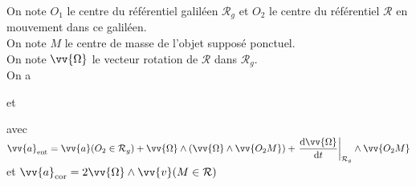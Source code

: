 ﻿\documentclass[a4paper]{article}
\begin{document}
\pagestyle{fancy}
\fancyhf{}
\setlength{\headheight}{15pt}

\begin{center}
	\large{}
\end{center}


On note \(O_1\) le centre du référentiel galiléen \(\mathcal{R}_g\) et \(O_2\) le centre du référentiel \(\mathcal{R}\) en mouvement dans ce galiléen.\\
On note \(M\) le centre de masse de l'objet supposé ponctuel.\\
On note \(\vv{\Omega}\) le vecteur rotation de \(\mathcal{R}\) dans \(\mathcal{R}_g\). \\
On a
\begin{center}
\end{center}
et
\begin{center}
\end{center}
avec \(\vv{a}_{\mathrm{ent}}=\vv{a}(O_2\in\mathcal{R}_g)+\vv{\Omega}\wedge(\vv{\Omega}\wedge\vv{O_2M})+
\left.\dfrac{\mathrm{d}\vv{\Omega}}{\mathrm{d}t}\right|_{\mathcal{R}_g}\wedge\vv{O_2M}\) \\
et \(\vv{a}_{\mathrm{cor}}=2\vv{\Omega}\wedge\vv{v}(M\in\mathcal{R})\)
\end{document}
